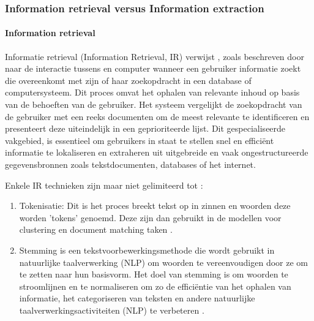\subsubsection{Information retrieval versus Information extraction}
\paragraph{Information retrieval}
Informatie retrieval (Information Retrieval, IR) verwijst , zoals beschreven door\textcite{Krallinger2024} naar de interactie tussens en computer wanneer een gebruiker informatie zoekt die overeenkomt met zijn of haar zoekopdracht in een database of computersysteem. Dit proces omvat het ophalen van relevante inhoud op basis van de behoeften van de gebruiker. Het systeem vergelijkt de zoekopdracht van de gebruiker met een reeks documenten om de meest relevante te identificeren en presenteert deze uiteindelijk in een geprioriteerde lijst. Dit gespecialiseerde vakgebied, is essentieel om gebruikers in staat te stellen snel en efficiënt informatie te lokaliseren en extraheren uit uitgebreide en vaak ongestructureerde gegevensbronnen zoals tekstdocumenten, databases of het internet.

Enkele IR technieken zijn maar niet gelimiteerd tot \autocite{IBM2024}:
\begin{enumerate}
    \item Tokenisatie: Dit is het proces breekt tekst op in zinnen en woorden deze worden 'tokens' genoemd. Deze zijn dan gebruikt in de modellen voor clustering en document matching taken \autocite{IBM2024}.
    \item Stemming is een tekstvoorbewerkingsmethode die wordt gebruikt in natuurlijke taalverwerking (NLP) om woorden te vereenvoudigen door ze om te zetten naar hun basisvorm. Het doel van stemming is om woorden te stroomlijnen en te normaliseren om zo de efficiëntie van het ophalen van informatie, het categoriseren van teksten en andere natuurlijke taalverwerkingsactiviteiten (NLP) te verbeteren \autocite{SC2024}.
\end{enumerate}

